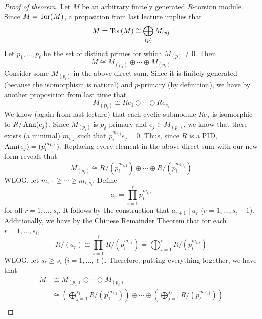 \documentclass[../notes.tex]{subfiles}
\begin{document}
\begin{itemize}
\begin{proof}[Proof of theorem]
        Let $M$ be an arbitrary finitely generated $R$-torsion module. Since $M=\operatorname{Tor}(M)$, a proposition from last lecture implies that
        \begin{equation*}
            M = \operatorname{Tor}(M) \cong \bigoplus_{(p)}M_{(p)}
        \end{equation*}
        Let $p_1,\dots,p_\ell$ be the set of distinct primes for which $M_{(p)}\neq 0$. Then
        \begin{equation*}
            M \cong M_{(p_1)}\oplus\cdots\oplus M_{(p_\ell)}
        \end{equation*}
        Consider some $M_{(p_i)}$ in the above direct sum. Since it is finitely generated (because the isomorphism is natural) and $p$-primary (by definition), we have by another proposition from last time that
        \begin{equation*}
            M_{(p_i)} \cong Re_1\oplus\cdots\oplus Re_{s_i}
        \end{equation*}
        We know (again from last lecture) that each cyclic submodule $Re_j$ is isomorphic to $R/\operatorname{Ann}(e_j)$. Since $M_{(p_i)}$ is $p_i$-primary and $e_j\in M_{(p_i)}$, we know that there exists (a minimal) $m_{i,j}$ such that $p_i^{m_{i,j}}e_j=0$. Thus, since $R$ is a PID, $\operatorname{Ann}(e_j)=(p_i^{m_{i,j}})$. Replacing every element in the above direct sum with our new form reveals that
        \begin{equation*}
            M_{(p_i)} \cong R/(p_i^{m_{i,1}})\oplus\cdots\oplus R/(p_i^{m_{i,s_i}})
        \end{equation*}
        WLOG, let $m_{i,1}\geq\cdots\geq m_{i,s_i}$. Define
        \begin{equation*}
            a_r = \prod_{i=1}^\ell p_i^{m_{i,r}}
        \end{equation*}
        for all $r=1,\dots,s_i$. It follows by the construction that $a_{r+1}\mid a_r$ ($r=1,\dots,s_i-1$). Additionally, we have by the \hyperref[trm:7.17]{Chinese Remainder Theorem} that for each $r=1,\dots,s_i$,
        \begin{equation*}
            R/(a_r) \cong \prod_{i=1}^\ell R/(p_i^{m_{i,r}}) = \bigoplus_{i=1}^\ell R/(p_i^{m_{i,r}})
        \end{equation*}
        WLOG, let $s_\ell\geq s_i$ ($i=1,\dots,\ell$). Therefore, putting everything together, we have that
        \begin{align*}
            M &\cong M_{(p_1)}\oplus\cdots\oplus M_{(p_\ell)}\\
            &\cong \left( \bigoplus_{j=1}^{s_1}R/(p_1^{m_{1,j}}) \right)\oplus\cdots\oplus\left( \bigoplus_{j=1}^{s_\ell}R/(p_\ell^{m_{\ell,j}}) \right)\\

\end{align*}
\end{proof}
\end{itemize}
\end{document}
